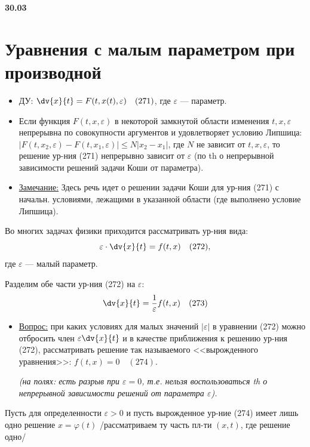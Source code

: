\vspace{0.5cm}
\noindent \textbf{30.03}
\section{Уравнения с малым параметром при производной}

\begin{itemize}
	\item ДУ: $\dv{x}{t} = F(t, x(t), \varepsilon) \quad (271)$, \quad где $\varepsilon$ --- параметр.
	\item Если функция $F(t,x,\varepsilon)$ в некоторой замкнутой области изменения $t, x, \varepsilon$ непрерывна по совокупности аргументов и удовлетворяет условию Липшица:
	$|F(t,x_2,\varepsilon) - F(t,x_1,\varepsilon)| \le N|x_2 - x_1|$, где $N$ не зависит от $t, x, \varepsilon$, то решение ур-ния (271) непрерывно зависит от $\varepsilon$ (по th о непрерывной зависимости решений задачи Коши от параметра).
	\item \underline{Замечание:} Здесь речь идет о решении задачи Коши для ур-ния (271) с начальн. условиями, лежащими в указанной области (где выполнено условие Липшица).
\end{itemize}

Во многих задачах физики приходится рассматривать ур-ния вида:
$$\varepsilon \cdot \dv{x}{t} = f(t,x) \quad (272),$$
где $\varepsilon$ --- малый параметр. 

Разделим обе части ур-ния (272) на $\varepsilon$:
\begin{equation}
	\dv{x}{t} = \frac{1}{\varepsilon} f(t,x) \quad (273)
\end{equation}

\begin{itemize}
	\item \underline{Вопрос:} при каких условиях для малых значений $|\varepsilon|$ в уравнении (272) можно отбросить член $\varepsilon \dv{x}{t}$ и в качестве приближения к решению ур-ния (272), рассматривать решение так называемого <<вырожденного уравнения>>: $f(t,x) = 0 \quad (274)$.
	
	\textit{(на полях: есть разрыв при $\varepsilon=0$, т.е. нельзя воспользоваться th о непрерывной зависимости решений от параметра $\varepsilon$).}
\end{itemize}

Пусть для определенности $\varepsilon > 0$ и пусть вырожденное ур-ние (274) имеет лишь одно решение $x=\varphi(t)$ /рассматриваем ту часть пл-ти $(x,t)$, где решение одно/

